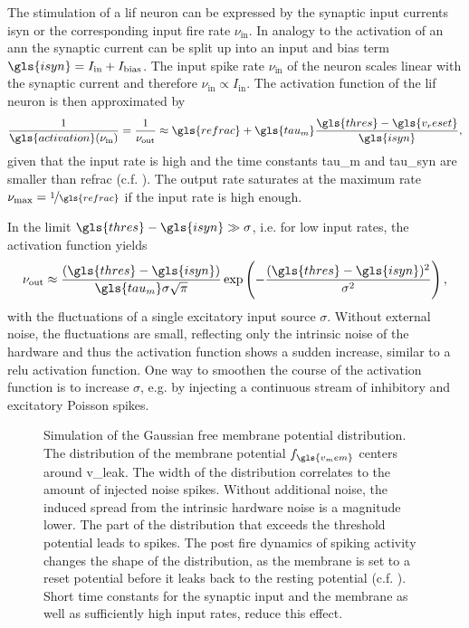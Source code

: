 The stimulation of a \gls{lif} neuron can be expressed by the synaptic input currents \gls{isyn} or the corresponding input fire rate $\nu_\text{in}$. In analogy to the activation of an \gls{ann} the synaptic current can be split up into an input and bias term $\gls{isyn} = I_\text{in} + I_\text{bias}$. The input spike rate $\nu_\text{in}$ of the neuron scales linear with the synaptic current and therefore $\nu_\text{in} \propto I_\text{in}$. The activation function of the \gls{lif} neuron is then approximated by 
\begin{equation}
\frac{1}{\gls{activation}(\nu_\text{in})} = \frac{1}{\nu_\text{out}} \approx \gls{refrac} + \gls{tau_m} \frac{\gls{thres} - \gls{v_reset}}{\gls{isyn}},
\label{fireratehigh}
\end{equation}
given that the input rate is high and the time constants \gls{tau_m} and \gls{tau_syn} are smaller than \gls{refrac} (c.f. \citealp{brunel2000dynamics}).
The output rate saturates at the maximum rate $\nu_\text{max} = \nicefrac{1}{\gls{refrac}}$ if the input rate is high enough.

In the limit $\gls{thres} - \gls{isyn} \gg \sigma$, i.e. for low input rates, the activation function yields
\begin{equation}
\nu_\text{out} \approx \frac{(\gls{thres} - \gls{isyn})}{\gls{tau_m}\sigma \sqrt{\pi}} \exp\left(-\frac{(\gls{thres} - \gls{isyn})^2}{\sigma^2}\right),
\label{fireratelow}
\end{equation}
with the fluctuations of a single excitatory input source $\sigma$. 
Without external noise, the fluctuations are small, reflecting only the intrinsic noise of the hardware and thus the activation function shows a sudden increase, similar to a \gls{relu} activation function. One way to smoothen the course of the activation function is to increase $\sigma$, e.g. by injecting a continuous stream of inhibitory and excitatory Poisson spikes.

\begin{figure}
	\begin{center}
		
	\end{center}
	\caption[Simulation of the Gaussian free membrane potential distribution.]{Simulation of the Gaussian free membrane potential distribution. The distribution of the membrane potential $f_{\gls{v_mem}}$ centers around \gls{v_leak}. The width of the distribution correlates to the amount of injected noise spikes. Without additional noise, the induced spread from the intrinsic hardware noise is a magnitude lower. The part of the distribution that exceeds the threshold potential leads to spikes. The post fire dynamics of spiking activity changes the shape of the distribution, as the membrane is set to a reset potential before it leaks back to the resting potential (c.f. \citealp{petrovici12phdthesis}). Short time constants for the synaptic input and the membrane as well as sufficiently high input rates, reduce this effect.}
	\label{vleak_w_noise}
\end{figure}

